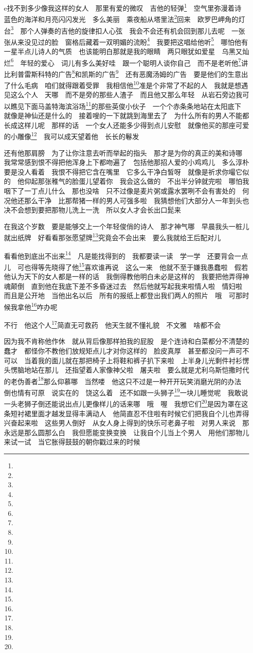 e{}找不到多少像我这样的女人　那里有爱的微叹　吉他的轻弹\footnote{}　空气里弥漫着诗　蓝色的海洋和月亮闪闪发光　多么美丽　乘夜船从塔里法\footnote{}回来　欧罗巴岬角的灯台\footnote{}　那个人弹奏的吉他的旋律扣人心弦　我会不会还有机会回到那儿去呢　一张张从来没见过的脸　窗格后藏着一双明媚的流盼\footnote{}　我要把这唱给他听\footnote{}　哪怕他有一星半点儿诗人的气质　也该能明白那就是我的眼睛　两只眼犹如爱星　乌黑又灿烂\footnote{}　年轻的爱心　词儿有多么美好哇　跟一个聪明人谈你自己　而不是老听他\footnote{}讲比利普雷斯科特的广告\footnote{}和凯斯的广告\footnote{}　还有恶魔汤姆的广告　要是他们的生意出了什么毛病　咱们就得跟着受罪　我相信他\footnote{}准是个非常了不起的人　我就是想遇见这么个人　天哪　而不是旁的那些人渣子　而且他又那么年轻　从岩石旁边我可以瞧见下面马盖特海滨浴场\footnote{}的那些英俊小伙子　一个个赤条条地站在太阳底下　就像是神仙还是什么的　接着嗖的一下就跳到海里去了　为什么所有的男人不能都长成这样儿呢　那样的话　一个女人还能多少得到点儿安慰　就像他买的那座可爱的小雕像\footnote{}　我可以成天望着他　长长的鬈发　
\par 还有他那肩膀　为了让你注意去听而举起的指头　那才是为你的真正的美和诗哪　我常常感到恨不得把他浑身上下都吻遍了　包括他那招人爱的小鸡鸡儿　多么淳朴　要是没人看着　我恨不得把它含在嘴里　它多么干净白皙呀　就像是祈求你嘬它似的　他仰起那张稚气的脸蛋儿望着你　我会这么做的　不出半分钟就完啦　哪怕我咽下了一丁点儿什么　那也没啥　只不过像是麦片粥或露水罢咧不会有害处的　何况他还那么干净　比那帮猪一样的男人可强多啦　我猜想他们大部分人一年到头也决不会想到要把那物儿洗上一洗　所以女人才会长出口髭来　
\par 在我这个岁数　要是能够交上一个年轻俊俏的诗人　那才神气哪　早晨我头一桩儿就出纸牌　好看看那张愿望牌\footnote{}究竟会不会出来　要么我就给王后配对儿　
\par 看看他到底出不出来\footnote{}　凡是能找得到的　我都要读一读　学一学　还要背会一点儿　可也得等先晓得了他\footnote{}喜欢谁再说　这么一来　他就不至于嫌我愚蠢啦　假若他认为天下的女人都是一样的话　我倒得教他明白未必是这样的　我要把他弄得神魂颠倒　直到他在我底下差不多昏迷过去　然后他就写起我来啦情人啦　情妇啦　而且是公开地　当他出名以后　所有的报纸上都登出我们两人的照片　哦　可那时候我拿他\footnote{}咋办呢　
\par 不行　他这个人\footnote{}简直无可救药　他天生就不懂礼貌　不文雅　啥都不会　
\par 因为我不肯称他作休　就从背后像那样拍我的屁股　是个连诗和白菜都分不清楚的蠢才　都怪你不教他们放规矩点儿才对你这样的　脸皮真厚　甚至都没问一声可不可以　当着我的面儿就在那把椅子上将鞋和裤子扒下来啦　上半身儿光剩件衬衫愣头愣脑地站在那儿　还指望着人家像神父啦　屠夫啦　要么就是尤利乌斯恺撒时代的老伪善者\footnote{}那么仰慕哪　当然喽　他这只不过是一种开开玩笑消磨光阴的办法　倒也情有可原　说实在的　饶这么着　还不如跟一头狮子\footnote{}一块儿睡觉呢　我敢说一头老狮子倒还能说出点儿更像样儿的话来哪　哦　喔　我想它们\footnote{}是因为罩在这条短衬裙里面才越发显得丰满动人　他简直忍不住啦有时候它们把我自个儿也弄得兴奋起来啦　这些男人倒好　从女人身上得到的快乐可老鼻子啦　对男人来说　那永远是那么圆那么白　我但愿能变换变换　让我自个儿当上个男人　用他们那物儿来试一试　当它胀得鼓鼓的朝你戳过来的时候　
